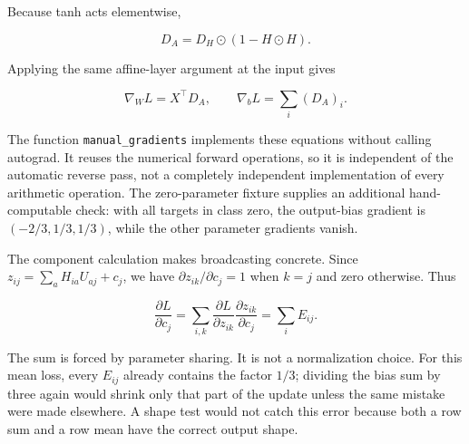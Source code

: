 Because tanh acts elementwise,

\begin{equation}
D_A=D_H\odot(1-H\odot H).
\end{equation}

Applying the same affine-layer argument at the input gives

\begin{equation}
\nabla_WL=X^\top D_A,\qquad
\nabla_bL=\sum_i(D_A)_i.
\end{equation}


The function \texttt{manual\_gradients} implements these equations
without calling autograd. It reuses the numerical forward operations, so
it is independent of the automatic reverse pass, not a completely
independent implementation of every arithmetic operation. The
zero-parameter fixture supplies an additional hand-computable check:
with all targets in class zero, the output-bias gradient is
\((-2/3,1/3,1/3)\), while the other parameter gradients vanish.


The component calculation makes broadcasting concrete. Since
\(z_{ij}=\sum_a H_{ia}U_{aj}+c_j\), we have
\(\partial z_{ik}/\partial c_j=1\) when \(k=j\) and zero otherwise. Thus

\begin{equation}
\frac{\partial L}{\partial c_j}
=\sum_{i,k}\frac{\partial L}{\partial z_{ik}}
             \frac{\partial z_{ik}}{\partial c_j}
=\sum_i E_{ij}.
\end{equation}

The sum is forced by parameter sharing. It is not a normalization
choice. For this mean loss, every \(E_{ij}\) already contains the factor
\(1/3\); dividing the bias sum by three again would shrink only that
part of the update unless the same mistake were made elsewhere. A shape
test would not catch this error because both a row sum and a row mean
have the correct output shape.

